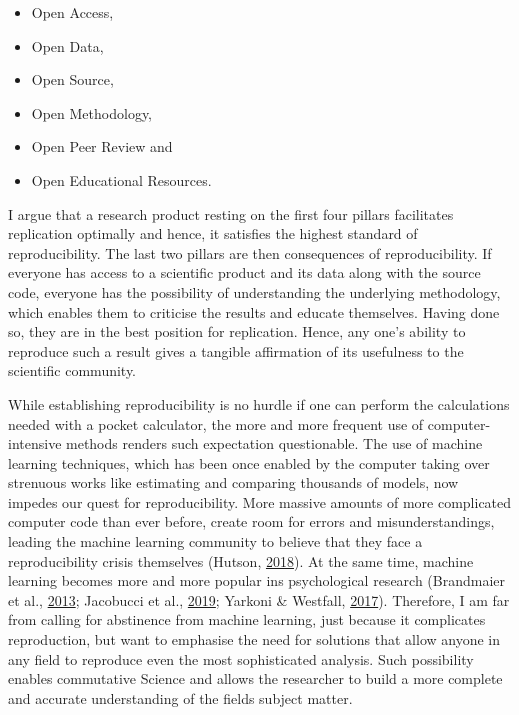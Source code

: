 \documentclass[12pt,a4paper,twoside]{article}
\providecommand{\tightlist}{%
  \setlength{\itemsep}{0pt}\setlength{\parskip}{0pt}}
\begin{document}
\begin{itemize}
\tightlist
\item
  Open Access,
\item
  Open Data,
\item
  Open Source,
\item
  Open Methodology,
\item
  Open Peer Review and
\item
  Open Educational Resources.
\end{itemize}

I argue that a research product resting on the first four pillars facilitates replication optimally and hence, it satisfies the highest standard of reproducibility.
The last two pillars are then consequences of reproducibility.
If everyone has access to a scientific product and its data along with the source code, everyone has the possibility of understanding the underlying methodology, which enables them to criticise the results and educate themselves.
Having done so, they are in the best position for replication.
Hence, any one's ability to reproduce such a result gives a tangible affirmation of its usefulness to the scientific community.

While establishing reproducibility is no hurdle if one can perform the calculations needed with a pocket calculator, the more and more frequent use of computer-intensive methods renders such expectation questionable.
The use of machine learning techniques, which has been once enabled by the computer taking over strenuous works like estimating and comparing thousands of models, now impedes our quest for reproducibility.
More massive amounts of more complicated computer code than ever before, create room for errors and misunderstandings, leading the machine learning community to believe that they face a reproducibility crisis themselves (Hutson, \protect\hyperlink{ref-hutsonArtificialIntelligenceFaces2018}{2018}).
At the same time, machine learning becomes more and more popular ins psychological research (Brandmaier et al., \protect\hyperlink{ref-brandmaierStructuralEquationModel2013}{2013}; Jacobucci et al., \protect\hyperlink{ref-jacobucciPracticalGuideVariable2019}{2019}; Yarkoni \& Westfall, \protect\hyperlink{ref-yarkoniChoosingPredictionExplanation2017}{2017}).
Therefore, I am far from calling for abstinence from machine learning, just because it complicates reproduction, but want to emphasise the need for solutions that allow anyone in any field to reproduce even the most sophisticated analysis.
Such possibility enables commutative Science and allows the researcher to build a more complete and accurate understanding of the fields subject matter.
\end{document}
